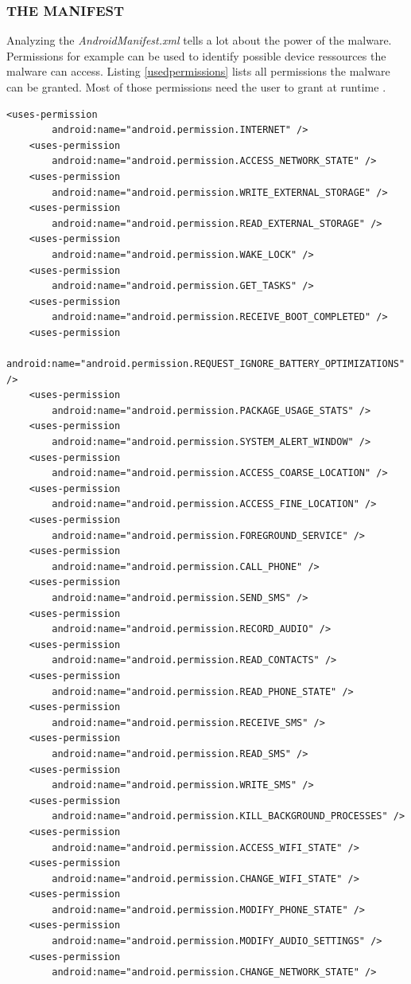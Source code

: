 \documentclass[10pt,titlepage]{article}
\begin{document}
\newpage
\subsubsection{THE MANIFEST} \label{manifest}
Analyzing the \textit{AndroidManifest.xml} tells a lot about the power of the malware. Permissions for example can be used to identify possible device ressources the malware can access. Listing \ref{usedpermissions} lists all permissions the malware can be granted. Most of those permissions need the user to grant at runtime \cite[guide/topics/permissions/overview]{AndroidDev}.

\begin{lstlisting}[label=usedpermissions,caption=Permissions defined in the Manifest of the malware,frame=tb]
	<uses-permission
        android:name="android.permission.INTERNET" />
    <uses-permission
        android:name="android.permission.ACCESS_NETWORK_STATE" />
    <uses-permission
        android:name="android.permission.WRITE_EXTERNAL_STORAGE" />
    <uses-permission
        android:name="android.permission.READ_EXTERNAL_STORAGE" />
    <uses-permission
        android:name="android.permission.WAKE_LOCK" />
    <uses-permission
        android:name="android.permission.GET_TASKS" />
    <uses-permission
        android:name="android.permission.RECEIVE_BOOT_COMPLETED" />
    <uses-permission
        android:name="android.permission.REQUEST_IGNORE_BATTERY_OPTIMIZATIONS" />
    <uses-permission
        android:name="android.permission.PACKAGE_USAGE_STATS" />
    <uses-permission
        android:name="android.permission.SYSTEM_ALERT_WINDOW" />
    <uses-permission
        android:name="android.permission.ACCESS_COARSE_LOCATION" />
    <uses-permission
        android:name="android.permission.ACCESS_FINE_LOCATION" />
    <uses-permission
        android:name="android.permission.FOREGROUND_SERVICE" />
    <uses-permission
        android:name="android.permission.CALL_PHONE" />
    <uses-permission
        android:name="android.permission.SEND_SMS" />
    <uses-permission
        android:name="android.permission.RECORD_AUDIO" />
    <uses-permission
        android:name="android.permission.READ_CONTACTS" />
    <uses-permission
        android:name="android.permission.READ_PHONE_STATE" />
    <uses-permission
        android:name="android.permission.RECEIVE_SMS" />
    <uses-permission
        android:name="android.permission.READ_SMS" />
    <uses-permission
        android:name="android.permission.WRITE_SMS" />
    <uses-permission
        android:name="android.permission.KILL_BACKGROUND_PROCESSES" />
    <uses-permission
        android:name="android.permission.ACCESS_WIFI_STATE" />
    <uses-permission
        android:name="android.permission.CHANGE_WIFI_STATE" />
    <uses-permission
        android:name="android.permission.MODIFY_PHONE_STATE" />
    <uses-permission
        android:name="android.permission.MODIFY_AUDIO_SETTINGS" />
    <uses-permission
        android:name="android.permission.CHANGE_NETWORK_STATE" />
\end{lstlisting}
\end{document}
